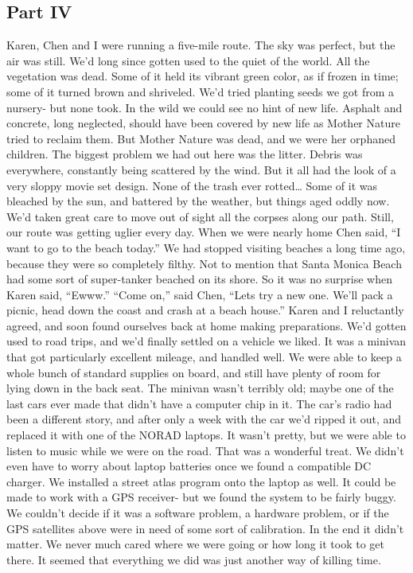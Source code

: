 \documentclass[a4paper]{article}
\begin{document}
\subsection{Part IV}
Karen, Chen and I were running a five-mile route. The sky was perfect, but the air was still. We’d long since gotten used to the quiet of the world.
All the vegetation was dead. Some of it held its vibrant green color, as if frozen in time; some of it turned brown and shriveled.
We’d tried planting seeds we got from a nursery- but none took. In the wild we could see no hint of new life. Asphalt and concrete, long neglected, should have been covered by new life as Mother Nature tried to reclaim them. But Mother Nature was dead, and we were her orphaned children.
The biggest problem we had out here was the litter. Debris was everywhere, constantly being scattered by the wind. But it all had the look of a very sloppy movie set design. None of the trash ever rotted… Some of it was bleached by the sun, and battered by the weather, but things aged oddly now. We’d taken great care to move out of sight all the corpses along our path. Still, our route was getting uglier every day.
When we were nearly home Chen said, “I want to go to the beach today.”
We had stopped visiting beaches a long time ago, because they were so completely filthy. Not to mention that Santa Monica Beach had some sort of super-tanker beached on its shore. So it was no surprise when Karen said, “Ewww.”
“Come on,” said Chen, “Lets try a new one. We’ll pack a picnic, head down the coast and crash at a beach house.”
Karen and I reluctantly agreed, and soon found ourselves back at home making preparations.
We’d gotten used to road trips, and we’d finally settled on a vehicle we liked. It was a minivan that got particularly excellent mileage, and handled well. We were able to keep a whole bunch of standard supplies on board, and still have plenty of room for lying down in the back seat.
The minivan wasn't terribly old; maybe one of the last cars ever made that didn’t have a computer chip in it. The car’s radio had been a different story, and after only a week with the car we’d ripped it out, and replaced it with one of the NORAD laptops. It wasn’t pretty, but we were able to listen to music while we were on the road. That was a wonderful treat. We didn’t even have to worry about laptop batteries once we found a compatible DC charger.
We installed a street atlas program onto the laptop as well. It could be made to work with a GPS receiver- but we found the system to be fairly buggy. We couldn’t decide if it was a software problem, a hardware problem, or if the GPS satellites above were in need of some sort of calibration. In the end it didn’t matter. We never much cared where we were going or how long it took to get there. It seemed that everything we did was just another way of killing time.
\end{document}
